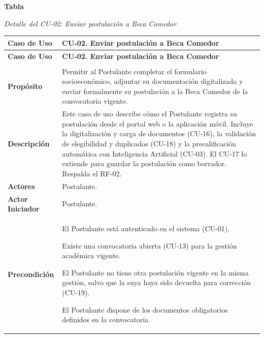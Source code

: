 \label{tab:detalle_cu02}
\noindent\textbf{Tabla~\thetable}\par\nopagebreak
\noindent\textit{Detalle del CU-02: Enviar postulación a Beca Comedor}\par\nopagebreak
\begingroup\small\linespread{1}\selectfont
\begin{longtable}{>{\raggedright\arraybackslash}p{2.9cm} >{\raggedright\arraybackslash}p{12.6cm}}
\toprule
\textbf{Caso de Uso} & \textbf{CU-02. Enviar postulación a Beca Comedor} \\
\midrule
\endfirsthead
\toprule
\textbf{Caso de Uso} & \textbf{CU-02. Enviar postulación a Beca Comedor} \\
\midrule
\endhead
\endfoot
\bottomrule
\multicolumn{2}{l}{\textit{Nota.} Elaboración propia.} \\
\endlastfoot
\textbf{Propósito} & Permitir al Postulante completar el formulario socioeconómico, adjuntar su documentación digitalizada y enviar formalmente su postulación a la Beca Comedor de la convocatoria vigente. \\
\midrule
\textbf{Descripción} & Este caso de uso describe cómo el Postulante registra su postulación desde el portal web o la aplicación móvil. Incluye la digitalización y carga de documentos (CU-16), la validación de elegibilidad y duplicados (CU-18) y la precalificación automática con Inteligencia Artificial (CU-03). El CU-17 lo extiende para guardar la postulación como borrador. Respalda el RF-02. \\
\midrule
\textbf{Actores} & Postulante. \\
\midrule
\textbf{Actor Iniciador} & Postulante. \\
\midrule
\textbf{Precondición} & \vspace{-\baselineskip}\begin{cuvin}
    \item El Postulante está autenticado en el sistema (CU-01).
    \item Existe una convocatoria abierta (CU-13) para la gestión académica vigente.
    \item El Postulante no tiene otra postulación vigente en la misma gestión, salvo que la suya haya sido devuelta para corrección (CU-19).
    \item El Postulante dispone de los documentos obligatorios definidos en la convocatoria.
\end{cuvin} \\

\end{longtable}
